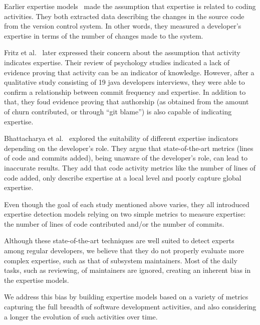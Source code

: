 Earlier expertise models~\citep{McDonald,mockus02} made the assumption that expertise is related to coding activities. They both extracted data describing the changes in the source code from the version control system. In other words, they measured a developer's expertise in terms of the number of changes made to the system.

Fritz et al.~\citep{Fritz-2007} later expressed their concern about the assumption that activity indicates expertise. Their review of psychology studies indicated a lack of evidence proving that activity can be an indicator of knowledge. However, after a qualitative study consisting of  19 java developers interviews, they were able to confirm a relationship between commit frequency and expertise. In addition to that, they foud evidence proving that authorship (as obtained from the amount of churn contributed, or through ``git blame'') is also capable of indicating expertise.

Bhattacharya et al.~\citep{Bhattacharya} explored the suitability of different expertise indicators depending on the developer's role. They argue that state-of-the-art metrics (lines of code and commits added), being unaware of the developer's role, can lead to inaccurate results. They add that code activity metrics like the number of lines of code added, only describe expertise at a local level and poorly capture global expertise. 

Even though the goal of each study mentioned above varies, they all introduced expertise detection models relying on two simple metrics to measure expertise: the number of lines of code contributed and/or the number of commits.

Although these state-of-the-art techniques are well suited to detect experts among regular developers, we believe that they do not properly evaluate more complex expertise, such as that of subsystem maintainers. Most of the daily tasks, such as reviewing, of maintainers are ignored, creating an inherent bias in the expertise models.

We address this bias by building expertise models based on a variety of metrics capturing the full breadth of software development activities, and also considering a longer the evolution of such activities over time.%







